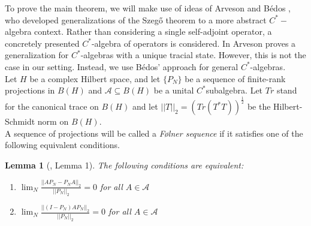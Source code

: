 \documentclass[article]{amsart}
\newtheorem{lemma}[theorem]{Lemma}
\begin{document}
To prove the main theorem, we will make use of ideas of Arveson \cite{MR1276162} and Bédos \cite{MR1458766}, who developed generalizations of the Szeg\H{o} theorem to a more abstract $C^*-$algebra context. Rather than considering a single self-adjoint operator, a concretely presented $C^*$-algebra of operators is considered. In \cite{MR1276162} Arveson proves a generalization for $C^*$-algebras with a unique tracial state. However, this is not the case in our setting. Instead, we use Bédos' approach \cite{MR1458766} for general $C^*$-algebras.\\

Let $H$ be a complex Hilbert space, and let $\{P_N\}$ be a sequence of finite-rank projections in $B(H)$ and $\mathcal{A}\subseteq B(H)$ be a unital $C^*$subalgebra. Let $Tr$ stand for the canonical trace on $B(H)$ and let $||T||_2 = (Tr(T^*T))^{\frac{1}{2}}$ be the Hilbert-Schmidt norm on $B(H)$.\\

A sequence of projections will be called a \textit{Følner sequence} if it satisfies one of the following equivalent conditions.
\begin{lemma}[\cite{MR1458766}, Lemma 1]
    The following conditions are equivalent:
    \begin{enumerate}
        \item $\lim_{N} \frac{||AP_N-P_NA||_2}{||P_N||_2}=0$ for all $A \in \mathcal{A} $ \\
        \item $\lim_{N} \frac{||(I-P_N)AP_N||_2}{||P_N||_2}=0$ for all  $A \in \mathcal{A} $ 
    \end{enumerate}
\end{lemma}
\end{document}
